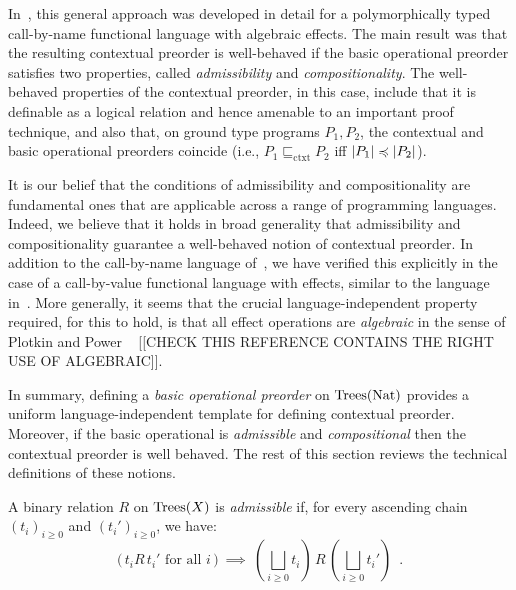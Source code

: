 In~\cite{gom}, this general approach was developed in detail for 
a polymorphically typed call-by-name functional language with algebraic effects. 
The main result was that the resulting contextual preorder is well-behaved if the basic operational preorder satisfies two properties, called \emph{admissibility} and \emph{compositionality}. The well-behaved properties of the contextual preorder, in this case, include that it is definable as a {logical relation} and hence amenable to an important proof technique, and also that, on ground type programs $P_1,P_2$,
the contextual and basic operational preorders coincide (i.e., $P_1 \sqsubseteq_\text{ctxt} P_2$ iff 
$|P_1| \preccurlyeq |P_2|$).

It is our belief that the conditions of admissibility and compositionality are fundamental ones that  are applicable 
across a range of programming  languages. Indeed, we believe that it holds in broad generality that 
admissibility and compositionality guarantee a well-behaved notion of contextual preorder. In addition to the 
call-by-name language of~\cite{gom}, we have verified this explicitly in the case of a call-by-value functional language with effects,
similar to the language in~\cite{plotkin2001adequacy}. More generally, it seems  that the crucial language-independent property required, for this to hold, is that all effect operations are \emph{algebraic} in the sense of Plotkin and Power ~\cite{plotkin2001adequacy} [[CHECK THIS REFERENCE CONTAINS THE RIGHT USE OF ALGEBRAIC]].


In summary, defining a \emph{basic operational preorder} on  $\textnormal{Trees}(\textnormal{Nat})$ provides a uniform language-independent template for defining contextual preorder. Moreover, if the basic operational is \emph{admissible} and \emph{compositional} then the 
contextual preorder is well behaved. The rest of this section reviews the technical definitions of these notions. 



\begin{definition}[Admissibility]
    A binary relation $R$ on $\textnormal{Trees}(X)$ is \emph{admissible} if,
    for every ascending chain $(t_i)_{i \geq 0}$ and 
    $(t_i')_{i\geq 0}$, we have:
    \[ \text{($\,t_i  R \, t_i'$ for all $i\,$)} ~ \implies~
        \left(\bigsqcup_{i \geq 0} t_i\right) \, R \, \left(\bigsqcup_{i \geq 0} t_i'\right) \enspace .
    \]
\end{definition}

